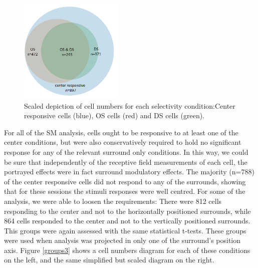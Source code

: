 \begin{figure}[H] \centering \includegraphics[width=5cm,height=5cm,keepaspectratio]{Figures/7.Results/data/centerOSDS.png} 
\caption{Scaled depiction of cell numbers for each selectivity condition:Center responsive cells (blue), OS cells (red) and DS cells (green).}
\label{groups2}
\end{figure}

For all of the SM analysis, cells ought to be responsive to at least one of the center conditions, but were also conservatively required to hold no significant response for any of the relevant surround only conditions. In this way, we could be sure that independently of the receptive field measurements of each cell, the portrayed effects were in fact surround modulatory effects.
The majority (n=788) of the center responsive cells did not respond to any of the surrounds, showing that for these sessions the stimuli responses were well centred. For some of the analysis, we were able to loosen the requirements: There were 812 cells responding to the center and not to the horizontally positioned surrounds, while 864 cells responded to the center and not to the vertically positioned surrounds. This groups were again assessed with the same statistical t-tests. These groups were used when analysis was projected in only one of the surround's position axis. Figure \ref{groups3} shows a cell numbers diagram for each of these conditions on the left, and the same simplified but scaled diagram on the right.

